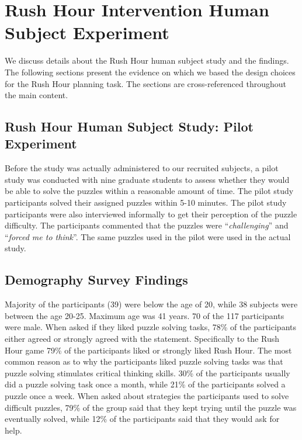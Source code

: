 \chapter{Rush Hour Intervention Human Subject Experiment}
\label{apx:rushintervention}
We discuss details about the Rush Hour human subject study and the findings. The following sections present the evidence on which we based the design choices for the Rush Hour planning task. The sections are cross-referenced throughout the main content.

\section{Rush Hour Human Subject Study: Pilot Experiment}
\label{ap:pilot}
Before the study was actually administered to our recruited subjects, a pilot study was conducted with nine graduate students to assess whether they would be able to solve the puzzles within a reasonable amount of time. The pilot study participants solved their assigned puzzles within 5-10 minutes. The pilot study participants were also interviewed informally to get their perception of the puzzle difficulty. The participants commented that the puzzles were ``\textit{challenging}'' and ``\textit{forced me to think}''. The same puzzles used in the pilot were used in the actual study.\\

\section{Demography Survey Findings}
\label{ap:demographics}
Majority of the participants (39) were below the age of 20, while 38 subjects were between the age 20-25. Maximum age was 41 years. 70 of the 117 participants were male. When asked if they liked puzzle solving tasks, 78\% of the participants either agreed or strongly agreed with the statement. Specifically to the Rush Hour game 79\% of the participants liked or strongly liked Rush Hour. The most common reason as to why the participants liked puzzle solving tasks was that puzzle solving stimulates critical thinking skills. 30\% of the participants usually did a puzzle solving task once a month, while 21\% of the participants solved a puzzle once a week. When asked about strategies the participants used to solve difficult puzzles, 79\% of the group said that they kept trying until the puzzle was eventually solved, while 12\% of the participants said that they would ask for help. 

